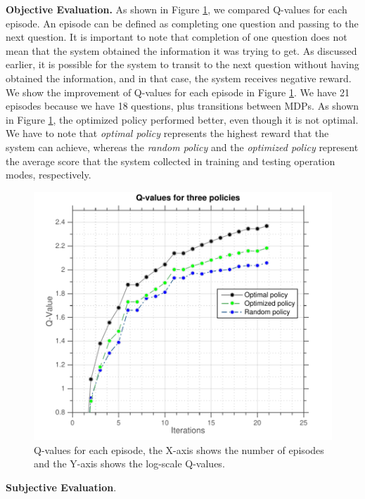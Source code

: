 \documentclass[letterpaper]{article}
\begin{document}
{\bf Objective Evaluation.}  
As shown in Figure \ref{q-values}, we compared Q-values for each episode. An episode can be defined as completing one question and passing to the next question. It is important to note that completion of one question does not mean that the system obtained the information it was trying to get. As discussed earlier, it is possible for the system to transit to the next question without having obtained the information, and in that case, the system receives negative reward. 
We show the improvement of Q-values for each episode in Figure \ref{q-values}. We have  21 episodes because we have 18 questions, plus transitions between MDPs. As shown in Figure \ref{q-values}, the optimized policy performed better, even though it is not optimal. We have to note that \textit{optimal policy} represents the highest reward that the system can achieve, whereas the \textit{random policy} and the \textit{optimized policy} represent the average score that the system collected in training and testing operation modes, respectively.

 \begin{figure}
 \centering
 \includegraphics[width=\columnwidth]{figures/q-values.pdf}
 \caption{Q-values for each episode, the X-axis shows the number of episodes and the Y-axis shows the log-scale Q-values.}
 \label{q-values}
 \end{figure}


{\bf Subjective Evaluation}. 
\end{document}
